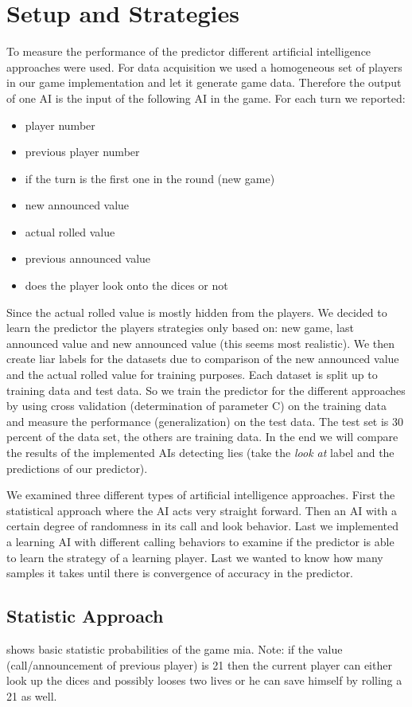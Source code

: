 \documentclass[11pt]{article}
\begin{document}
\section{Setup and Strategies}
\label{sec:setstrat}
To measure the performance of the predictor different artificial intelligence approaches were used. For data acquisition we used a homogeneous set of players in our game implementation and let it generate game data. 
Therefore the output of one AI is the input of the following AI in the game.
For each turn we reported:
\begin{itemize}
	\item player number
	\item previous player number
	\item if the turn is the first one in the round (new game)
	\item new announced value
	\item actual rolled value
	\item previous announced value
	\item does the player look onto the dices or not
\end{itemize}
Since the actual rolled value is mostly hidden from the players. We decided to learn the predictor the players strategies only based on: new game, last announced value and new announced value (this seems most realistic).
We then create liar labels for the datasets due to comparison of the new announced value and the actual rolled value for training purposes.
Each dataset is split up to training data and test data. So we train the predictor for the different approaches by using cross validation (determination of parameter C) on the training data and measure the performance (generalization) on the test data. The test set is 30 percent of the data set, the others are training data.
In the end we will compare the results of the implemented AIs detecting lies (take the \textit{look at} label and the predictions of our predictor).

We examined three different types of artificial intelligence approaches. First the statistical approach where the AI acts very straight forward. Then an AI with a certain degree of randomness in its call and look behavior. Last we implemented a learning AI with different calling behaviors to examine if the predictor is able to learn the strategy of a learning player. Last we wanted to know how many samples it takes until there is convergence of accuracy in the predictor. 

\subsection{Statistic Approach}
\label{ssec:statistic}
 shows basic statistic probabilities of the game mia. Note: if the value (call/announcement of previous player) is 21 then the current player can either look up the dices and possibly looses two lives or he can save himself by rolling a 21 as well. 
\end{document}
